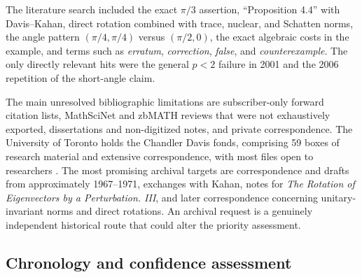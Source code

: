 \documentclass[11pt]{article}
\begin{document}
The literature search included the exact $\pi/3$ assertion, ``Proposition 4.4''
with Davis--Kahan, direct rotation combined with trace, nuclear, and Schatten
norms, the angle pattern $(\pi/4,\pi/4)$ versus $(\pi/2,0)$, the exact algebraic
costs in the example, and terms such as \emph{erratum}, \emph{correction},
\emph{false}, and \emph{counterexample}.  The only directly relevant hits were
the general $p<2$ failure in 2001 and the 2006 repetition of the short-angle
claim.

The main unresolved bibliographic limitations are subscriber-only forward
citation lists, MathSciNet and zbMATH reviews that were not exhaustively
exported, dissertations and non-digitized notes, and private correspondence.
The University of Toronto holds the Chandler Davis fonds, comprising 59 boxes
of research material and extensive correspondence, with most files open to
researchers \cite{ChandlerDavisFonds}.  The most promising archival targets are
correspondence and drafts from approximately 1967--1971, exchanges with Kahan,
notes for \emph{The Rotation of Eigenvectors by a Perturbation. III}, and later
correspondence concerning unitary-invariant norms and direct rotations.  An
archival request is a genuinely independent historical route that could alter
the priority assessment.

\subsection{Chronology and confidence assessment}
\end{document}
